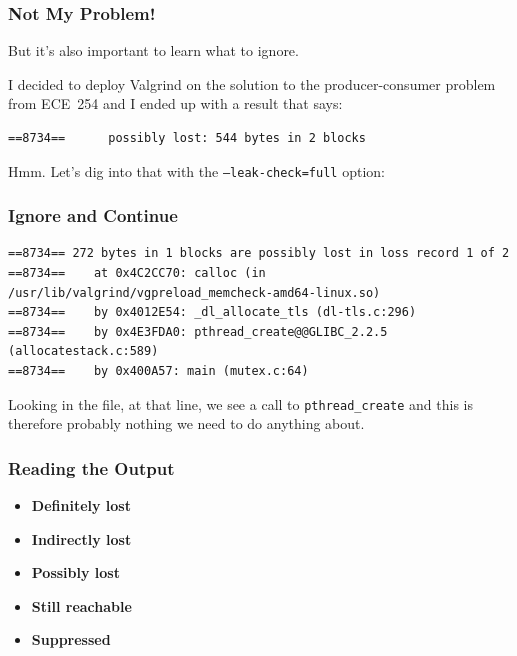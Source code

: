 \begin{frame}[fragile]
	\frametitle{Not My Problem!}

	But it's also important to learn what to ignore.

	I decided to deploy Valgrind on the solution to the producer-consumer problem from ECE~254 and I ended up with a result that says:

	\begin{verbatim}
==8734==      possibly lost: 544 bytes in 2 blocks
\end{verbatim}

	Hmm. Let's dig into that with the \texttt{--leak-check=full} option:

\end{frame}

\begin{frame}[fragile]
	\frametitle{Ignore and Continue}
	{\scriptsize
		\begin{verbatim}
==8734== 272 bytes in 1 blocks are possibly lost in loss record 1 of 2
==8734==    at 0x4C2CC70: calloc (in /usr/lib/valgrind/vgpreload_memcheck-amd64-linux.so)
==8734==    by 0x4012E54: _dl_allocate_tls (dl-tls.c:296)
==8734==    by 0x4E3FDA0: pthread_create@@GLIBC_2.2.5 (allocatestack.c:589)
==8734==    by 0x400A57: main (mutex.c:64)
\end{verbatim}
	}

	Looking in the file, at that line, we see a call to \texttt{pthread\_create} and this is therefore probably nothing we need to do anything about.


\end{frame}

\begin{frame}
	\frametitle{Reading the Output}

	\begin{itemize}
		\item \textbf{Definitely lost}
		\item \textbf{Indirectly lost}
		\item \textbf{Possibly lost}
		\item \textbf{Still reachable}
		\item \textbf{Suppressed}
	\end{itemize}



\end{frame}


